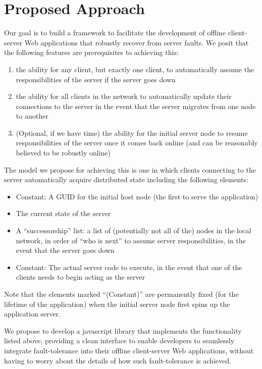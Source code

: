 \section{Proposed Approach}
\label{sec:approach}

Our goal is to build a framework to facilitate the development of offline client-server Web applications that robustly recover from server faults. 
We posit that the following features are prerequisites to achieving this:

\begin{enumerate}
	\item the ability for any client, but exactly one client, to automatically assume the responsibilities of the server if the server goes down
    \item the ability for all clients in the network to automatically update their connections to the server in the event that the server migrates from one node to another
    \item (Optional, if we have time) the ability for the initial server node to resume responsibilities of the server once it comes back online (and can be reasonably believed to be robustly online)
\end{enumerate}

The model we propose for achieving this is one in which clients connecting to the server automatically acquire distributed state including the following elements:

\begin{itemize}
	\item Constant: A GUID for the initial host node (the first to serve the application)
    \item The current state of the server
	\item A ``successorship'' list: a list of (potentially not all of the) nodes in the local network, in order of ``who is next'' to assume server responsibilities, in the event that the server goes down
    \item Constant: The actual server code to execute, in the event that one of the clients needs to begin acting as the server
\end{itemize}

Note that the elements marked ``(Constant)'' are permanently fixed (for the lifetime of the application) when the initial server node first spins up the application server.

We propose to develop a javascript library that implements the functionality listed above, providing a clean interface to enable developers to seamlessly integrate fault-tolerance into their offline client-server Web applications, without having to worry about the details of how such fault-tolerance is achieved.

